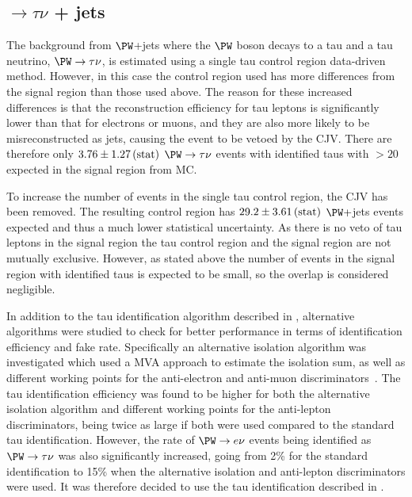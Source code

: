 \subsection{\PW$\rightarrow \tau\nu$ + jets}
\label{sec:promptwtaunu}
The background from $\PW$+jets where the $\PW$ boson decays to a tau and a tau neutrino, $\PW\rightarrow\tau\nu$, is estimated using a single tau control region data-driven method. However, in this case the control region used has more differences from the signal region than those used above. The reason for these increased differences is that the reconstruction efficiency for tau leptons is significantly lower than that for electrons or muons, and they are also more likely to be misreconstructed as jets, causing the event to be vetoed by the \ac{CJV}. There are therefore only $3.76\pm 1.27\,\text{(stat)}$ $\PW\rightarrow\tau\nu$ events with identified taus with \pt$>20$ \GeV expected in the signal region from \ac{MC}.

To increase the number of events in the single tau control region, the \ac{CJV} has been removed. The resulting control region has $29.2\pm 3.61\,\text{(stat)}$ $\PW+$jets events expected and thus a much lower statistical uncertainty. As there is no veto of tau leptons in the signal region the tau control region and the signal region are not mutually exclusive. However, as stated above the number of events in the signal region with identified taus is expected to be small, so the overlap is considered negligible.

In addition to the tau identification algorithm described in , alternative algorithms were studied to check for better performance in terms of identification efficiency and fake rate. Specifically an alternative isolation algorithm was investigated which used a \ac{MVA} approach to estimate the isolation sum, as well as different working points for the anti-electron and anti-muon discriminators~\cite{CMS-PAS-TAU-11-001}. The tau identification efficiency was found to be higher for both the alternative isolation algorithm and different working points for the anti-lepton discriminators, being twice as large if both were used compared to the standard tau identification. However, the rate of $\PW\rightarrow e\nu$ events being identified as $\PW\rightarrow\tau\nu$ was also significantly increased, going from 2\% for the standard identification to 15\% when the alternative isolation and anti-lepton discriminators were used. It was therefore decided to use the tau identification described in .

